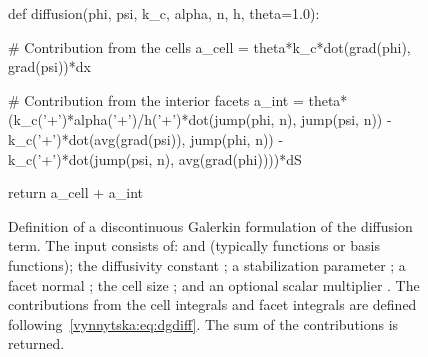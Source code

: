 \begin{figure}
  \begin{center}
    \begin{python}
def diffusion(phi, psi, k_c, alpha, n, h, theta=1.0):

    # Contribution from the cells
    a_cell = theta*k_c*dot(grad(phi), grad(psi))*dx

    # Contribution from the interior facets
    a_int = theta*(k_c('+')*alpha('+')/h('+')*dot(jump(phi, n), jump(psi, n))
                   - k_c('+')*dot(avg(grad(psi)), jump(phi, n))
                   - k_c('+')*dot(jump(psi, n), avg(grad(phi))))*dS

    return a_cell + a_int
    \end{python}
    \caption{Definition of a discontinuous Galerkin formulation of the
      diffusion term. The input consists of:  and 
      (typically functions or basis functions); the diffusivity
      constant ; a stabilization parameter ; a
      facet normal ; the cell size ; and an optional
      scalar multiplier . The contributions from the cell
      integrals and facet integrals are defined
      following~\eqref{vynnytska:eq:dgdiff}. The sum of the
      contributions is returned.}
  \end{center}
  \label{vynnytska:fig:diffusion}
\end{figure}

